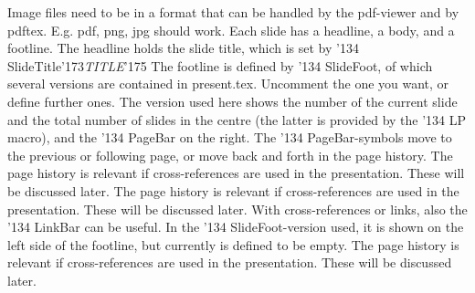 Image files need to be in a format that can be handled by the pdf-viewer and by {\cf pdftex}.
E.g. pdf, png, jpg should work.
\NewSlide
Each slide has a headline, a body, and a footline.
\vskip5pt
The headline holds the slide title, which is set by 
\vskip5pt
{\cf\char'134 SlideTitle\char'173}{\it TITLE\/}{\cf\char'175}
\vskip5pt
The footline is defined by 
{\cf\char'134 SlideFoot}, of which several versions are contained in {\cf present.tex}. Uncomment the one you want,
or define further ones.
\vskip5pt
The version used here shows the number of the current slide and the total number of slides in the centre (the latter is
provided by the {\cf\char'134 LP} macro), and the {\cf\char'134 PageBar} on the right.
\vskip5pt
The {\cf\char'134 PageBar}-symbols \PageBar move to the previous or following page, or move back and forth in the 
page history.
\NewSlide
The page history is relevant if cross-references are used in the presentation. These will be discussed later.
\vskip5pt
\vskip5pt
\vskip5pt
\phantom{This slide has been shown incrementally by a copy-paste procedure when writing the source (have a look at it). 
It is straightforward, very flexible, one might occasionally lose track, and it may be tedious to introduce
changes later. A further possibility is shown on the next slides.}
\NewFrame
The page history is relevant if cross-references are used in the presentation. These will be discussed later.
\vskip5pt
With cross-references or links, also the {\cf\char'134 LinkBar} can be useful. In the {\cf\char'134 SlideFoot}-version
used, it is shown on the left side of the footline, but currently is defined to be empty.
\vskip5pt
\vskip5pt
\phantom{This slide has been shown incrementally by a copy-paste procedure when writing the source (have a look at it). 
It is straightforward, very flexible, one might occasionally lose track, and it may be tedious to introduce
changes later. A further possibility is shown on the next slides.}
\NewFrame
The page history is relevant if cross-references are used in the presentation. These will be discussed later.
